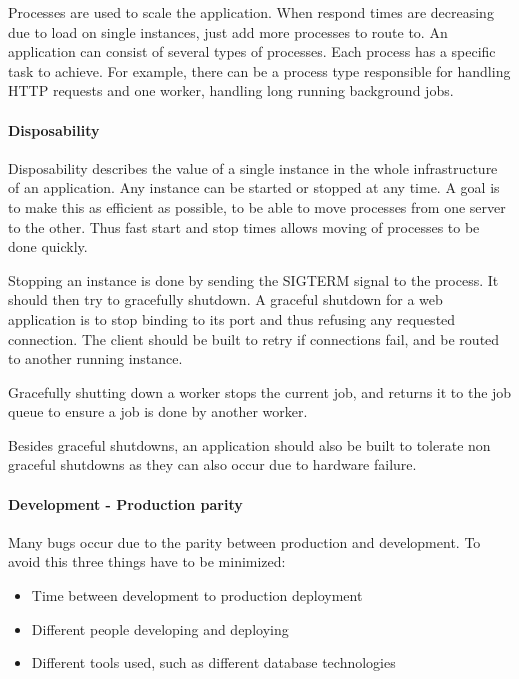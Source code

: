 Processes are used to scale the application. When respond times are decreasing
due to load on single instances, just add more processes to route to. An
application can consist of several types of processes. Each process has a
specific task to achieve. For example, there can be a process type responsible
for handling HTTP requests and one worker, handling long running background
jobs.

\paragraph{Disposability}

Disposability describes the value of a single instance in the whole
infrastructure of an application. Any instance can be started or stopped at any
time. A goal is to make this as efficient as possible, to be able to move
processes from one server to the other. Thus fast start and stop times allows
moving of processes to be done quickly.

Stopping an instance is done by sending the SIGTERM signal to the process. It
should then try to gracefully shutdown. A graceful shutdown for a web
application is to stop binding to its port and thus refusing any requested
connection. The client should be built to retry if connections fail, and be
routed to another running instance.

Gracefully shutting down a worker stops the current job, and returns it to the
job queue to ensure a job is done by another worker.

Besides graceful shutdowns, an application should also be built to tolerate non
graceful shutdowns as they can also occur due to hardware failure.

\paragraph{Development - Production parity}

Many bugs occur due to the parity between production and development. To avoid
this three things have to be minimized:

\begin{itemize}
  \item{Time between development to production deployment}
  \item{Different people developing and deploying}
  \item{Different tools used, such as different database technologies}
\end{itemize}

